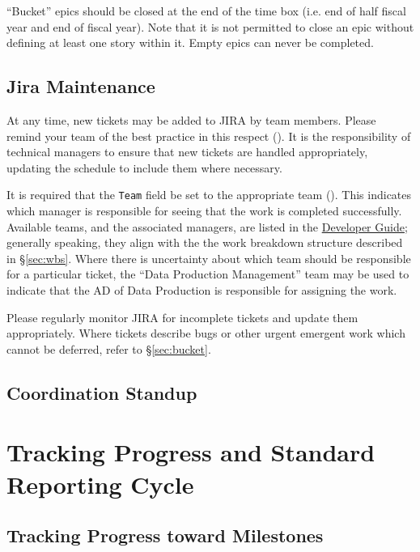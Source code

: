 \begin{itemize}
``Bucket'' epics should be closed at the end of the time box (i.e. end of half fiscal year and end of fiscal year).
Note that it is not permitted to close an \gls{epic} without defining at least one \gls{story} within it.
Empty \glspl{epic} can never be completed.


\subsection{Jira Maintenance}
\label{sec:jira-maintenance}

At any time, new tickets may be added to \gls{JIRA} by team members.
Please remind your team of the best practice in this respect ().
It is the responsibility of technical managers to ensure that new tickets are handled appropriately, updating the schedule to include them where necessary.

It is required that the \texttt{Team} field be set to the appropriate team ().
This indicates which manager is responsible for \gls{seeing} that the work is completed successfully.
Available teams, and the associated managers, are listed in the \href{https://developer.lsst.io/processes/jira_agile.html}{Developer Guide}; generally speaking, they align with the the work breakdown structure described in \S\ref{sec:wbs}.
Where there is uncertainty about which team should be responsible for a particular ticket, the “Data Production Management” team may be used to indicate that the \gls{AD} of Data Production is responsible for assigning the work.

Please regularly monitor \gls{JIRA} for incomplete tickets and update them appropriately.
Where tickets describe bugs or other urgent emergent work which cannot be deferred, refer to \S\ref{sec:bucket}.

\subsection{Coordination Standup}
\label{sec:sup}


\section{Tracking Progress and Standard Reporting Cycle}
\label{sec:reporting-cycle}

\subsection{Tracking Progress toward Milestones}
\label{sec:track-progress}


\end{itemize}

